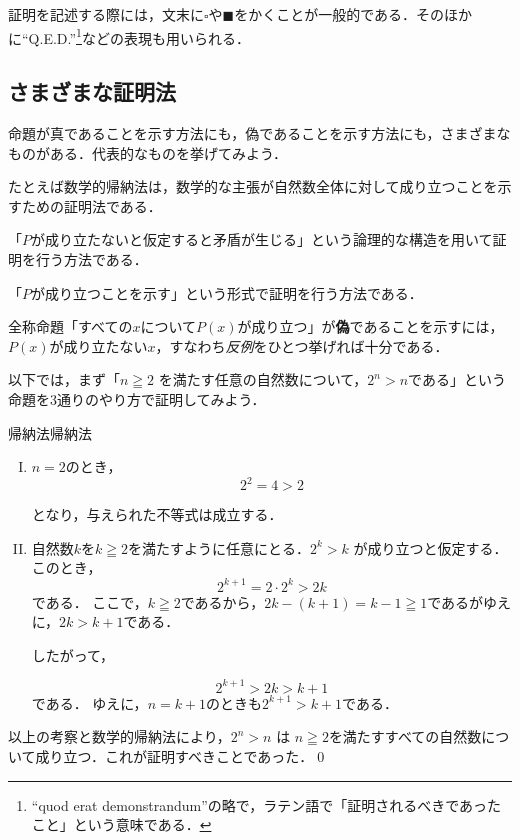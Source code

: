\begin{mycolumn}
  証明を記述する際には，文末に$\square$や$\blacksquare$をかくことが一般的である．そのほかに``Q.E.D.''\footnote{``quod erat demonstrandum''の略で，ラテン語で「証明されるべきであったこと」という意味である．}などの表現も用いられる．
\end{mycolumn}

\subsection{さまざまな証明法}

命題が真であることを示す方法にも，偽であることを示す方法にも，さまざまなものがある．代表的なものを挙げてみよう．

\begin{description}[descnext]
  \item[帰納法\index{きのうほう@帰納法}]
        たとえば数学的帰納法は，数学的な主張が自然数全体に対して成り立つことを示すための証明法である．
  \item[背理法\index{はいりほう@背理法}]
        「$P$が成り立たないと仮定すると矛盾が生じる」という論理的な構造を用いて証明を行う方法である．
  \item[直接証明\index{ちょくせつしょうめい@直接証明}]
        「$P$が成り立つことを示す」という形式で証明を行う方法である．
  \item[反例による反証\index{はんれい@反例}]
        全称命題「すべての$x$について$P(x)$が成り立つ」が\textbf{偽}であることを示すには，$P(x)$が成り立たない$x$，すなわち\emph{反例}をひとつ挙げれば十分である．
\end{description}

以下では，まず「$n \geqq 2$ を満たす任意の自然数について，$2^n > n$である」という命題を3通りのやり方で証明してみよう．

\begin{example}{帰納法}{帰納法}
  \begin{enumerate}[(I)]
    \item $n=2$のとき，
          \[
            2^2 = 4 > 2
          \]

          となり，与えられた不等式は成立する．
    \item 自然数$k$を$k \geqq 2$を満たすように任意にとる．$2^k > k$ が成り立つと仮定する．このとき，
          \[
            2^{k+1} = 2 \cdot 2^k > 2k
          \]
          である．
          ここで，$k \geqq 2$であるから，$2k - (k + 1) = k - 1 \geqq 1$であるがゆえに，$2k > k + 1$である．

          したがって，

          \[
            2^{k+1} > 2k > k + 1
          \]
          である．
          ゆえに，$n=k+1$のときも$2^{k+1} > k + 1$である．
  \end{enumerate}

  以上の考察と数学的帰納法により，$2^n > n$ は $n \geqq 2$を満たすすべての自然数について成り立つ．これが証明すべきことであった．\qed
\end{example}

